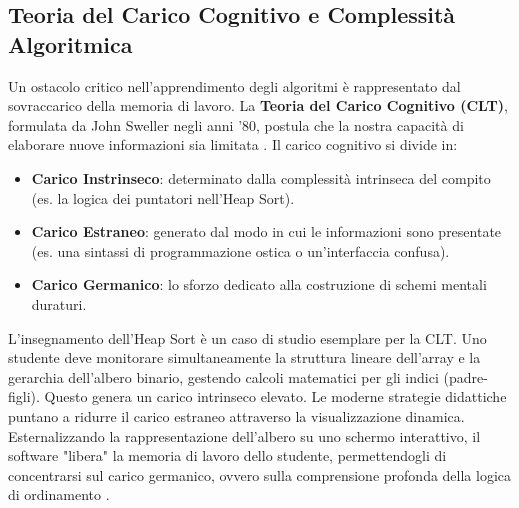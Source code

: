\documentclass[openany]{theme/uniprthesis}
\begin{document}
\subsection{Teoria del Carico Cognitivo e Complessità Algoritmica}
Un ostacolo critico nell'apprendimento degli algoritmi è rappresentato dal sovraccarico della memoria di lavoro. La \textbf{Teoria del Carico Cognitivo (CLT)}, formulata da John Sweller negli anni '80, postula che la nostra capacità di elaborare nuove informazioni sia limitata \cite{sweller1988}. Il carico cognitivo si divide in:
\begin{itemize}
    \item \textbf{Carico Instrinseco}: determinato dalla complessità intrinseca del compito (es. la logica dei puntatori nell'Heap Sort).
    \item \textbf{Carico Estraneo}: generato dal modo in cui le informazioni sono presentate (es. una sintassi di programmazione ostica o un'interfaccia confusa).
    \item \textbf{Carico Germanico}: lo sforzo dedicato alla costruzione di schemi mentali duraturi.
\end{itemize}

L'insegnamento dell'Heap Sort è un caso di studio esemplare per la CLT. Uno studente deve monitorare simultaneamente la struttura lineare dell'array e la gerarchia dell'albero binario, gestendo calcoli matematici per gli indici (padre-figli). Questo genera un carico intrinseco elevato. Le moderne strategie didattiche puntano a ridurre il carico estraneo attraverso la visualizzazione dinamica. Esternalizzando la rappresentazione dell'albero su uno schermo interattivo, il software "libera" la memoria di lavoro dello studente, permettendogli di concentrarsi sul carico germanico, ovvero sulla comprensione profonda della logica di ordinamento \cite{mayer2005cognitive}.
\end{document}
